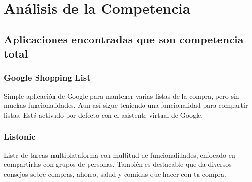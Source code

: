 \chapter{Análisis de la Competencia}
\section{Aplicaciones encontradas que son competencia total}

\begin{minipage}[t]{0.5\textwidth}
\vspace{0pt}
\subsection{Google Shopping List}
Simple aplicación de Google para mantener varias listas de la compra, pero sin muchas funcionalidades. Aun así sigue teniendo una funcionalidad para compartir listas. Está activado por defecto con el asistente virtual de Google.
\subsection{Listonic}
Lista de tareas multiplataforma con multitud de funcionalidades, enfocado en compartirlas con grupos de personas. También es destacable que da diversos consejos sobre compras, ahorro, salud y comidas que hacer con tu compra.
\end{minipage} %
